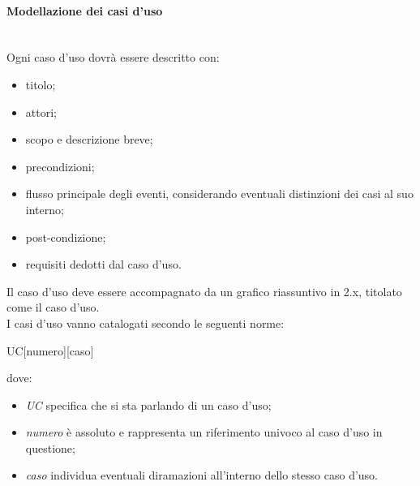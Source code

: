 \paragraph{Modellazione dei casi d'uso}\mbox{}\\
Ogni caso d'uso dovrà essere descritto con:
\begin{itemize}
	\item titolo;
	\item attori;
	\item scopo e descrizione breve;
	\item precondizioni;
	\item flusso principale degli eventi, considerando eventuali distinzioni dei casi al suo interno;
	\item post-condizione;
	\item requisiti dedotti dal caso d'uso.
\end{itemize}
Il caso d'uso deve essere accompagnato da un grafico riassuntivo in  2.x, titolato come il caso d'uso.\\
I casi d'uso vanno catalogati secondo le seguenti norme:
\begin{center}
	UC[numero][caso]
\end{center}
dove:
\begin{itemize}
	\item \textit{UC} specifica che si sta parlando di un caso d'uso;
	\item \textit{numero} è assoluto e rappresenta un riferimento univoco al caso d'uso in questione;
	\item \textit{caso} individua eventuali diramazioni all'interno dello stesso caso d’uso.
\end{itemize}

